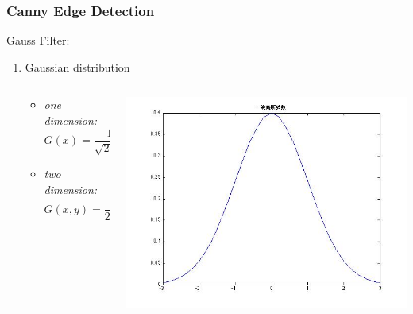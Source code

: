 \documentclass[notheorems,serif,table,compress]{beamer}  %
\begin{document}
\begin{frame}
\frametitle{Canny Edge Detection}
{\color{blue}Gauss Filter:}
    \begin{enumerate}
        \item Gaussian distribution
            \begin{columns}
            \begin{column}{0.55\linewidth}
              \begin{itemize}
                \item \emph{one dimension:}
                    \begin{displaymath}
                    G(x)=\frac {1}{\sqrt{2\pi}\sigma}e^{-\frac{x^{2}}{2\sigma^{2}}}
                    \end{displaymath}
                \item \emph{two dimension:}
                    \begin{displaymath}
                    G(x,y)=\frac {1}{2\pi \sigma^{2}}e^{-\frac{x^{2}+y^{2}}{2\sigma^{2}}}
                    \end{displaymath}
              \end{itemize}
            \end{column}
            \begin{column}{0.45\linewidth}
                \centering\includegraphics[width=0.6\linewidth]{gaoyi.jpg}
                

\end{column}
\end{columns}
\end{enumerate}
\end{frame}
\end{document}
